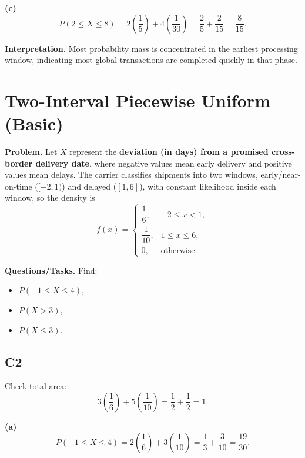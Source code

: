 
\textbf{(c)}
\[
P(2\le X\le 8)=2\left(\frac{1}{5}\right)+4\left(\frac{1}{30}\right)=\frac{2}{5}+\frac{2}{15}=\frac{8}{15}.
\]


\textbf{Interpretation.}
Most probability mass is concentrated in the earliest processing window, indicating most global transactions are completed quickly in that phase.

\section{Two-Interval Piecewise Uniform (Basic)}

\textbf{Problem.}
Let $X$ represent the \textbf{deviation (in days) from a promised cross-border delivery date}, where negative values mean early delivery and positive values mean delays. The carrier classifies shipments into two windows, early/near-on-time ($[-2,1)$) and delayed ($[1,6]$), with constant likelihood inside each window, so the density is
\[
f(x)=
\begin{cases}
	\dfrac{1}{6}, & -2\le x<1,\\
	\dfrac{1}{10}, & 1\le x\le 6,\\
	0, & \text{otherwise.}
\end{cases}
\]

\textbf{Questions/Tasks.}
Find:
\begin{itemize}
	\item[(a)] $P(-1\le X\le 4)$,
	\item[(b)] $P(X>3)$,
	\item[(c)] $P(X\le 3)$.
\end{itemize}

\subsection*{C2}
Check total area:
\[
3\left(\frac{1}{6}\right)+5\left(\frac{1}{10}\right)=\frac{1}{2}+\frac{1}{2}=1.
\]


\textbf{(a)}
\[
P(-1\le X\le 4)=2\left(\frac{1}{6}\right)+3\left(\frac{1}{10}\right)=\frac{1}{3}+\frac{3}{10}=\frac{19}{30}.
\]


